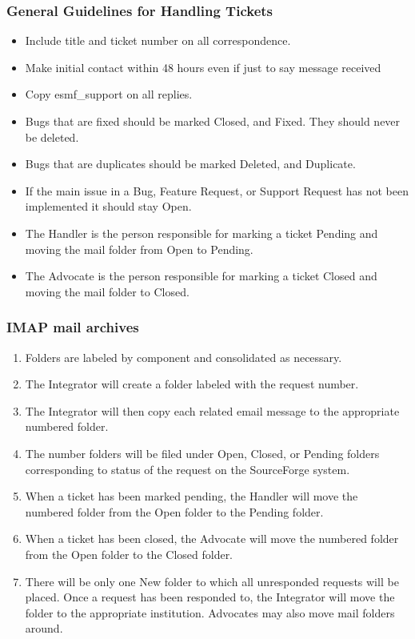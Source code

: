\begin{enumerate}
\subsubsection{General Guidelines for Handling Tickets}
\begin{itemize}
\item Include title and ticket number on all correspondence.
\item Make initial contact within 48 hours even if just to say message received
\item Copy esmf\_support on all replies.
\item Bugs that are fixed should be marked Closed, and Fixed. They should never be deleted. 
\item Bugs that are duplicates should be marked Deleted, and Duplicate. 
\item If the main issue in a Bug, Feature Request, or Support Request has not been implemented it should stay Open.
\item The Handler is the person responsible for marking a ticket Pending and moving the mail folder from Open to Pending.
\item The Advocate is the person responsible for marking a ticket Closed and moving the mail folder to Closed.
\end{itemize}

\subsubsection{IMAP mail archives}
\begin{enumerate}
\item Folders are labeled by component and consolidated as necessary.
\item The Integrator will create a folder labeled with the request number. 
\item The Integrator will then copy each related email message to the appropriate 
numbered folder. 
\item The number folders will be filed under Open, Closed, or Pending folders 
corresponding to status of the request on the SourceForge system.

\item When a ticket has been marked pending, the Handler will move the numbered folder from the Open folder to the Pending folder.
\item When a ticket has been closed, the Advocate will move the numbered folder from the Open folder to the Closed folder.
\item There will be only one New folder to which all unresponded requests will be placed. Once a request has been responded to, the Integrator will move the folder to the appropriate institution. Advocates may also move mail folders around.
\end{enumerate}


\end{enumerate}
